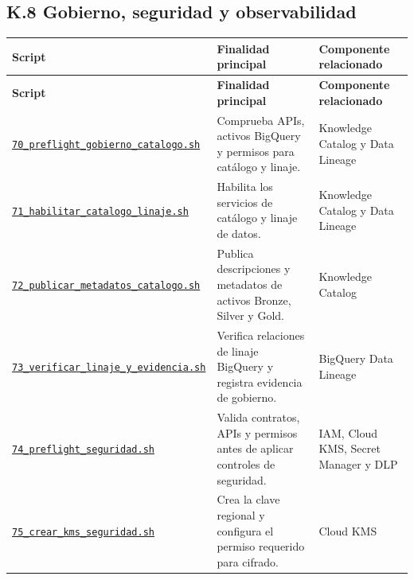 \documentclass[11pt]{article}
\begin{document}
\subsection*{K.8 Gobierno, seguridad y observabilidad}
\begingroup\scriptsize
\begin{longtable}{@{}>{\raggedright\arraybackslash}p{}>{\raggedright\arraybackslash}p{}>{\raggedright\arraybackslash}p{}@{}}
\toprule
\textbf{Script} & \textbf{Finalidad principal} & \textbf{Componente relacionado} \\
\midrule
\endfirsthead
\toprule
\textbf{Script} & \textbf{Finalidad principal} & \textbf{Componente relacionado} \\
\midrule
\endhead
\href{https://github.com/Codenid/lumina-retail-data-platform/blob/main/implementation/automatizacion/scripts70_preflight_gobierno_catalogo.sh}{\texttt{70\_\allowbreak{}preflight\_\allowbreak{}gobierno\_\allowbreak{}catalogo.sh}} & Comprueba APIs, activos BigQuery y permisos para catálogo y linaje. & Knowledge Catalog y Data Lineage \\
\href{https://github.com/Codenid/lumina-retail-data-platform/blob/main/implementation/automatizacion/scripts71_habilitar_catalogo_linaje.sh}{\texttt{71\_\allowbreak{}habilitar\_\allowbreak{}catalogo\_\allowbreak{}linaje.sh}} & Habilita los servicios de catálogo y linaje de datos. & Knowledge Catalog y Data Lineage \\
\href{https://github.com/Codenid/lumina-retail-data-platform/blob/main/implementation/automatizacion/scripts72_publicar_metadatos_catalogo.sh}{\texttt{72\_\allowbreak{}publicar\_\allowbreak{}metadatos\_\allowbreak{}catalogo.sh}} & Publica descripciones y metadatos de activos Bronze, Silver y Gold. & Knowledge Catalog \\
\href{https://github.com/Codenid/lumina-retail-data-platform/blob/main/implementation/automatizacion/scripts73_verificar_linaje_y_evidencia.sh}{\texttt{73\_\allowbreak{}verificar\_\allowbreak{}linaje\_\allowbreak{}y\_\allowbreak{}evidencia.sh}} & Verifica relaciones de linaje BigQuery y registra evidencia de gobierno. & BigQuery Data Lineage \\
\href{https://github.com/Codenid/lumina-retail-data-platform/blob/main/implementation/automatizacion/scripts74_preflight_seguridad.sh}{\texttt{74\_\allowbreak{}preflight\_\allowbreak{}seguridad.sh}} & Valida contratos, APIs y permisos antes de aplicar controles de seguridad. & IAM, Cloud KMS, Secret Manager y DLP \\
\href{https://github.com/Codenid/lumina-retail-data-platform/blob/main/implementation/automatizacion/scripts75_crear_kms_seguridad.sh}{\texttt{75\_\allowbreak{}crear\_\allowbreak{}kms\_\allowbreak{}seguridad.sh}} & Crea la clave regional y configura el permiso requerido para cifrado. & Cloud KMS \\

\end{longtable}
\end{document}
